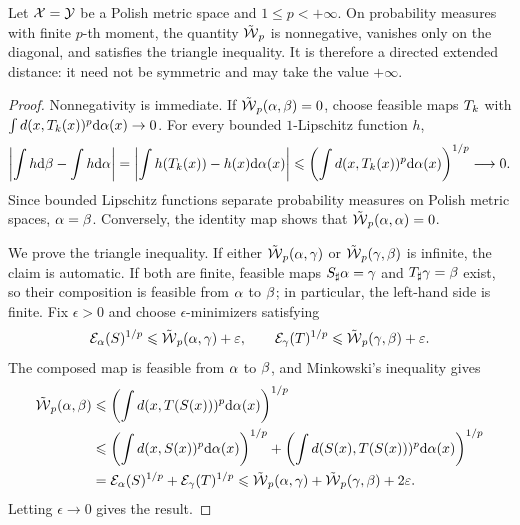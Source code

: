 \begin{prop}\label{prop-directed-monge-distance}
	Let $\mathcal{X}=\mathcal{Y}$ be a Polish metric space and $1\leq p<+\infty$. On probability measures with finite $p$-th moment, the quantity $\tilde{\operatorname{\mathcal{W}}}_p$ is nonnegative, vanishes only on the diagonal, and satisfies the triangle inequality. It is therefore a directed extended distance: it need not be symmetric and may take the value $+\infty$.
\end{prop}
\begin{proof}
	Nonnegativity is immediate. If $\tilde{\operatorname{\mathcal{W}}}_p(\alpha,\beta)=0$, choose feasible maps $T_k$ with $\int d(x,T_k(x))^p\mathrm{d}\alpha(x)\to0$. For every bounded $1$-Lipschitz function $h$,
	\[
		\left|\int h\mathrm{d}\beta-\int h\mathrm{d}\alpha\right|
		=
		\left|\int h(T_k(x))-h(x)\mathrm{d}\alpha(x)\right|
		\leqslant
		\left(\int d(x,T_k(x))^p\mathrm{d}\alpha(x)\right)^{1/p}
		\longrightarrow0.
	\]
	Since bounded Lipschitz functions separate probability measures on Polish metric spaces, $\alpha=\beta$. Conversely, the identity map shows that $\tilde{\operatorname{\mathcal{W}}}_p(\alpha,\alpha)=0$.

	We prove the triangle inequality. If either $\tilde{\operatorname{\mathcal{W}}}_p(\alpha,\gamma)$ or $\tilde{\operatorname{\mathcal{W}}}_p(\gamma,\beta)$ is infinite, the claim is automatic. If both are finite, feasible maps $S_\sharp\alpha=\gamma$ and $T_\sharp\gamma=\beta$ exist, so their composition is feasible from $\alpha$ to $\beta$; in particular, the left-hand side is finite. Fix $\epsilon>0$ and choose $\epsilon$-minimizers satisfying
	\[
		\mathcal{E}_\alpha(S)^{1/p}\leqslant\tilde{\operatorname{\mathcal{W}}}_p(\alpha,\gamma)+\varepsilon,
		\qquad
		\mathcal{E}_\gamma(T)^{1/p}\leqslant\tilde{\operatorname{\mathcal{W}}}_p(\gamma,\beta)+\varepsilon.
	\]
	The composed map is feasible from $\alpha$ to $\beta$, and Minkowski's inequality gives
	\[
	\begin{aligned}
		\tilde{\operatorname{\mathcal{W}}}_p(\alpha,\beta)
		&\leqslant
		\left(\int d(x,T(S(x)))^p\mathrm{d}\alpha(x)\right)^{1/p} \\
		&\leqslant
		\left(\int d(x,S(x))^p\mathrm{d}\alpha(x)\right)^{1/p}
		+
		\left(\int d(S(x),T(S(x)))^p\mathrm{d}\alpha(x)\right)^{1/p} \\
		&=
		\mathcal{E}_\alpha(S)^{1/p}+\mathcal{E}_\gamma(T)^{1/p}
		\leqslant
		\tilde{\operatorname{\mathcal{W}}}_p(\alpha,\gamma)+\tilde{\operatorname{\mathcal{W}}}_p(\gamma,\beta)+2\varepsilon.
	\end{aligned}
	\]
	Letting $\epsilon\to0$ gives the result.
\end{proof}


